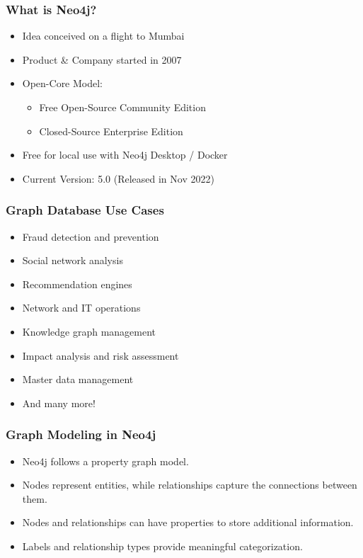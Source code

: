 \begin{frame}[fragile]\frametitle{What is Neo4j?}
  \begin{itemize}
    \item Idea conceived on a flight to Mumbai
    \item Product \& Company started in 2007
    \item Open-Core Model:
    \begin{itemize}
      \item Free Open-Source Community Edition
      \item Closed-Source Enterprise Edition
    \end{itemize}
    \item Free for local use with Neo4j Desktop / Docker
	\item Current Version: 5.0 (Released in Nov 2022)
  \end{itemize}
\end{frame}


\begin{frame}[fragile]\frametitle{Graph Database Use Cases}
  \begin{itemize}
    \item Fraud detection and prevention
    \item Social network analysis
    \item Recommendation engines
    \item Network and IT operations
    \item Knowledge graph management
    \item Impact analysis and risk assessment
    \item Master data management
    \item And many more!
  \end{itemize}
\end{frame}

\begin{frame}[fragile]\frametitle{Graph Modeling in Neo4j}
  \begin{itemize}
    \item Neo4j follows a property graph model.
    \item Nodes represent entities, while relationships capture the connections between them.
    \item Nodes and relationships can have properties to store additional information.
    \item Labels and relationship types provide meaningful categorization.
  \end{itemize}
\end{frame}

